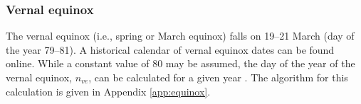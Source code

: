 \subsubsection{Vernal equinox}
\label{sec:equinox}
The vernal equinox (i.e., spring or March equinox) falls on 19--21 March (day of the year 79--81). 
A historical calendar of vernal equinox dates can be found online\footnotemark {}. 
While a constant value of 80 may be assumed, the day of the year of the vernal equinox, $n_{ve}$, can be calculated for a given year \parencite[Ch. 26]{meeus91}. 
The algorithm for this calculation is given in Appendix \ref{app:equinox}.

